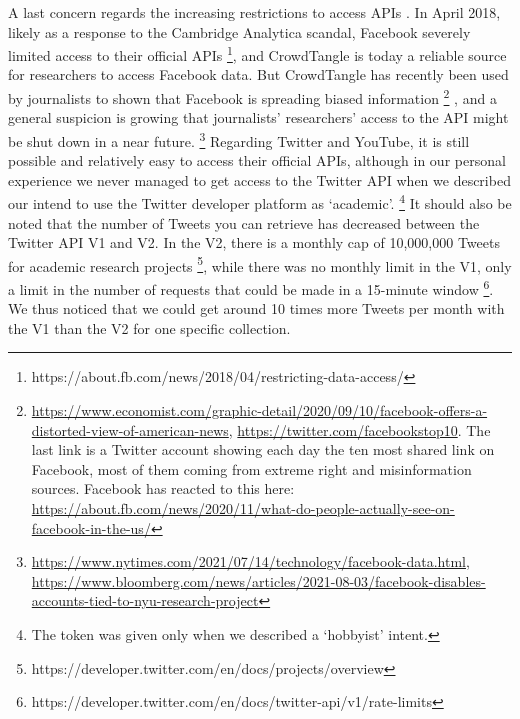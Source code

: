 \documentclass{article}
\begin{document}
A last concern regards the increasing restrictions to access APIs \cite{api}.
In April 2018, likely as a response to the Cambridge Analytica scandal, Facebook severely limited access to their official APIs
\footnote{https://about.fb.com/news/2018/04/restricting-data-access/}, 
and CrowdTangle is today a reliable source for researchers to access Facebook data. 
But CrowdTangle has recently been used by journalists to shown that Facebook is spreading biased information
\footnote{\url{https://www.economist.com/graphic-detail/2020/09/10/facebook-offers-a-distorted-view-of-american-news}, \url{https://twitter.com/facebookstop10}. 
The last link is a Twitter account showing each day the ten most shared link on Facebook, most of them coming from extreme right and misinformation sources. 
Facebook has reacted to this here: \url{https://about.fb.com/news/2020/11/what-do-people-actually-see-on-facebook-in-the-us/}}
, and a general suspicion is growing that journalists' researchers' access to the API might be shut down in a near future.
\footnote{\url{https://www.nytimes.com/2021/07/14/technology/facebook-data.html}, \url{https://www.bloomberg.com/news/articles/2021-08-03/facebook-disables-accounts-tied-to-nyu-research-project}}
Regarding Twitter and YouTube, it is still possible and relatively easy to access their official APIs, although in our personal experience we never managed to get access to the Twitter API when we described our intend to use the Twitter developer platform as `academic'.
\footnote{The token was given only when we described a `hobbyist' intent.}
It should also be noted that the number of Tweets you can retrieve has decreased between the Twitter API V1 and V2. 
In the V2, there is a monthly cap of 10,000,000 Tweets for academic research projects
\footnote{https://developer.twitter.com/en/docs/projects/overview},
while there was no monthly limit in the V1, only a limit in the number of requests that could be made in a 15-minute window
\footnote{https://developer.twitter.com/en/docs/twitter-api/v1/rate-limits}.
We thus noticed that we could get around 10 times more Tweets per month with the V1 than the V2 for one specific collection.

\smallskip
\end{document}
